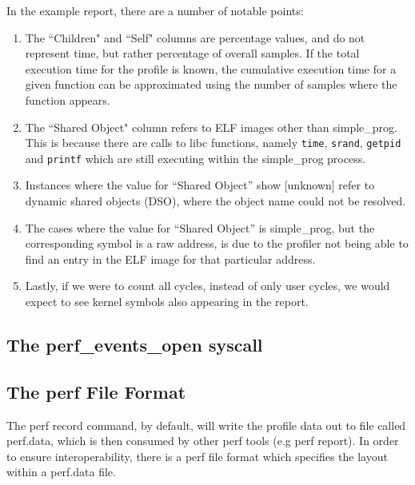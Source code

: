 In the example report, there are a number of notable points:
\ssp
\begin{enumerate}
    \item The ``Children" and ``Self" columns are percentage values, and do not represent time, but rather percentage of overall samples. If the total execution time for the profile is known, the cumulative execution time for a given function can be approximated using the number of samples where the function appears. 
    \item The ``Shared Object" column refers to ELF images other than simple\_prog. This is because there are calls to libc functions, namely \texttt{time}, \texttt{srand}, \texttt{getpid} and \texttt{printf} which are still executing within the simple\_prog process.
    \item Instances where the value for ``Shared Object'' show [unknown] refer to dynamic shared objects (DSO), where the object name could not be resolved.
    \item The cases where the value for ``Shared Object'' is simple\_prog, but the corresponding symbol is a raw address, is due to the profiler not being able to find an entry in the ELF image for that particular address.
    \item Lastly, if we were to count all cycles, instead of only user cycles, we would expect to see kernel symbols also appearing in the report.
\end{enumerate}
\dsp

\subsection{The perf\_events\_open syscall}

\subsection{The perf File Format}

The perf record command, by default, will write the profile data out to file called perf.data, which is then consumed by other perf tools (e.g perf report). In order to ensure interoperability, there is a perf file format which specifies the layout within a perf.data file.
